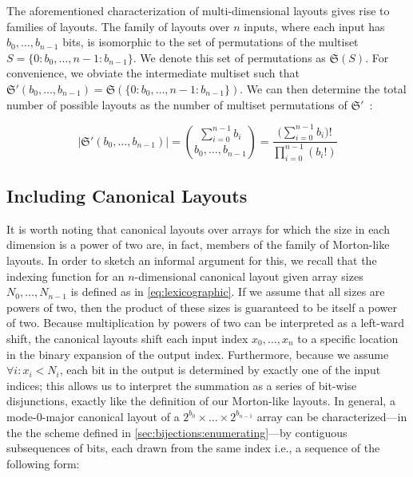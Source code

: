 The aforementioned characterization of multi-dimensional layouts gives rise to families of layouts. The family of layouts over $n$ inputs, where each input has $b_0,\ldots,b_{n-1}$ bits, is isomorphic to the set of permutations of the multiset $S = \{0:b_0,\ldots,n-1:b_{n-1}\}$. We denote this set of permutations as $\mathfrak{S}(S)$. For convenience, we obviate the intermediate multiset such that $\mathfrak{S}'(b_0,\ldots,b_{n-1}) = \mathfrak{S}(\{0:b_0,\ldots,n-1:b_{n-1}\})$. We can then determine the total number of possible layouts as the number of multiset permutations of $\mathfrak{S}'$~\cite[p.~42]{brualdi1977introductory}:

\begin{equation}
\label{eq:permutation_set_size}
|\mathfrak{S}'(b_0, \ldots, b_{n-1})| = \binom{\sum_{i = 0}^{n-1} b_i}{b_0,\ldots,b_{n-1}} = \frac{\big(\sum_{i = 0}^{n-1} b_i \big)!}{\prod_{i = 0}^{n-1} (b_i!)}    
\end{equation}

\subsection{Including Canonical Layouts}

\label{sec:bijections:canonical}

It is worth noting that canonical layouts over arrays for which the size in each dimension is a power of two are, in fact, members of the family of Morton-like layouts. In order to sketch an informal argument for this, we recall that the indexing function for an $n$-dimensional canonical layout given array sizes $N_0, \ldots, N_{n-1}$ is defined as in \cref{eq:lexicographic}. If we assume that all sizes are powers of two, then the product of these sizes is guaranteed to be itself a power of two. Because multiplication by powers of two can be interpreted as a left-ward shift, the canonical layouts shift each input index $x_0, \ldots, x_n$ to a specific location in the binary expansion of the output index. Furthermore, because we assume $\forall i : x_i < N_i$, each bit in the output is determined by exactly one of the input indices; this allows us to interpret the summation as a series of bit-wise disjunctions, exactly like the definition of our Morton-like layouts. In general, a mode-0-major canonical layout of a $2^{b_0} \times \ldots \times 2^{b_{n-1}}$ array can be characterized---in the the scheme defined in \cref{sec:bijections:enumerating}---by contiguous subsequences of bits, each drawn from the same index i.e., a sequence of the following form:

